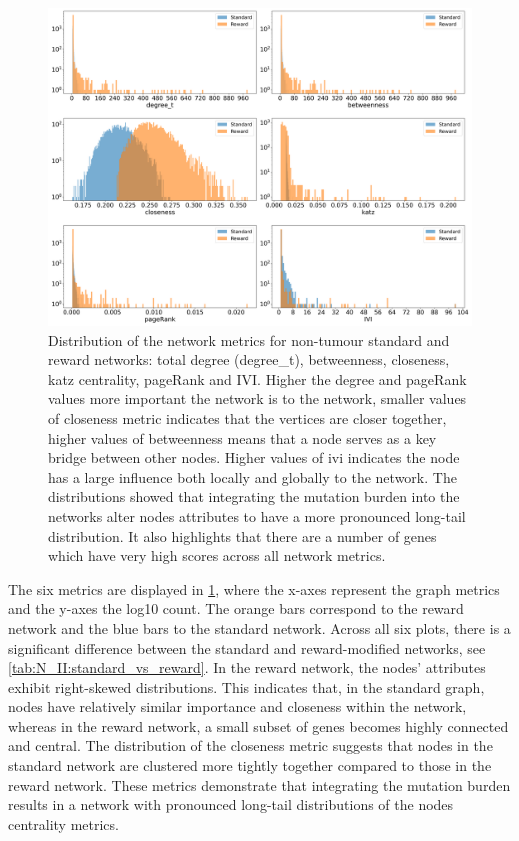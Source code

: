 \begin{figure}[!b]    
    \centering
    \includegraphics[width=1.0\textwidth,height=1.0\textheight,keepaspectratio]{Sections/Network_II/validation/net_metrics_Standard_Reward.png}
    \caption[Network metrics for healthy graphs]{Distribution of the network metrics for non-tumour standard and reward networks: total degree (degree\_t), betweenness, closeness, katz centrality, pageRank and IVI.  Higher the degree and pageRank values more important the network is to the network, smaller values of closeness metric indicates that the vertices are closer together, higher values of betweenness means that a node serves as a key bridge between other nodes. Higher values of \acrlong{ivi} indicates the node has a large influence both locally and globally to the network. The distributions showed that integrating the mutation burden into the networks alter nodes attributes to have a more pronounced long-tail distribution. It also highlights that there are a number of genes which have very high scores across  all network metrics.}
    \label{fig:N_II:net_metric_sig_std}
\end{figure}

The six metrics are displayed in \cref{fig:N_II:net_metric_sig_std}, where the x-axes represent the graph metrics and the y-axes the log10 count. The orange bars correspond to the reward network and the blue bars to the standard network. Across all six plots, there is a significant difference between the standard and reward-modified networks, see \cref{tab:N_II:standard_vs_reward}. In the reward network, the nodes' attributes exhibit right-skewed distributions. This indicates that, in the standard graph, nodes have relatively similar importance and closeness within the network, whereas in the reward network, a small subset of genes becomes highly connected and central. The distribution of the closeness metric suggests that nodes in the standard network are clustered more tightly together compared to those in the reward network. These metrics demonstrate that integrating the mutation burden results in a network with pronounced long-tail distributions of the nodes centrality metrics.

